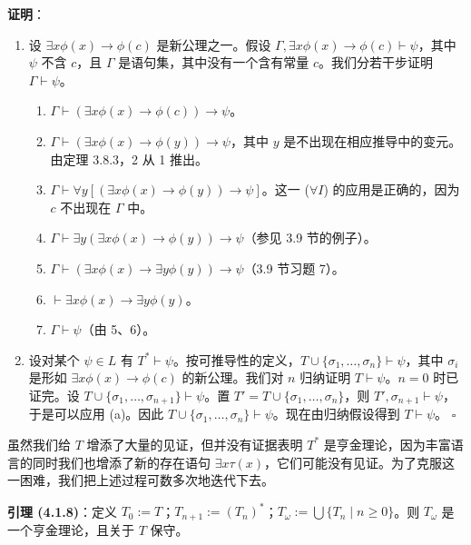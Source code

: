 \documentclass[12pt, a4paper]{article}
\begin{document}
\textbf{证明}：
\begin{enumerate}
    \item[(a)] 设 \(\exists x \phi(x) \to \phi(c)\) 是新公理之一。假设 \(\Gamma, \exists x \phi(x) \to \phi(c) \vdash \psi\)，其中 \(\psi\) 不含 \(c\)，且 \(\Gamma\) 是语句集，其中没有一个含有常量 \(c\)。我们分若干步证明 \(\Gamma \vdash \psi\)。
    \begin{enumerate}
        \item \(\Gamma \vdash (\exists x \phi(x) \to \phi(c)) \to \psi\)。
        \item \(\Gamma \vdash (\exists x \phi(x) \to \phi(y)) \to \psi\)，其中 \(y\) 是不出现在相应推导中的变元。由定理 3.8.3，2 从 1 推出。
        \item \(\Gamma \vdash \forall y[(\exists x \phi(x) \to \phi(y)) \to \psi]\)。这一 (\(\forall I\)) 的应用是正确的，因为 \(c\) 不出现在 \(\Gamma\) 中。
        \item \(\Gamma \vdash \exists y(\exists x \phi(x) \to \phi(y)) \to \psi\)（参见 3.9 节的例子）。
        \item \(\Gamma \vdash (\exists x \phi(x) \to \exists y \phi(y)) \to \psi\)（3.9 节习题 7）。
        \item \(\vdash \exists x \phi(x) \to \exists y \phi(y)\)。
        \item \(\Gamma \vdash \psi\)（由 5、6）。
    \end{enumerate}
    \item[(b)] 设对某个 \(\psi \in L\) 有 \(T^* \vdash \psi\)。按可推导性的定义，\(T \cup \{\sigma_1, \dots, \sigma_n\} \vdash \psi\)，其中 \(\sigma_i\) 是形如 \(\exists x \phi(x) \to \phi(c)\) 的新公理。我们对 \(n\) 归纳证明 \(T \vdash \psi\)。\(n=0\) 时已证完。设 \(T \cup \{\sigma_1, \dots, \sigma_{n+1}\} \vdash \psi\)。置 \(T' = T \cup \{\sigma_1, \dots, \sigma_n\}\)，则 \(T', \sigma_{n+1} \vdash \psi\)，于是可以应用 (a)。因此 \(T \cup \{\sigma_1, \dots, \sigma_n\} \vdash \psi\)。现在由归纳假设得到 \(T \vdash \psi\)。 \hfill \(\square\)
\end{enumerate}

虽然我们给 \(T\) 增添了大量的见证，但并没有证据表明 \(T^*\) 是亨金理论，因为丰富语言的同时我们也增添了新的存在语句 \(\exists x \tau(x)\)，它们可能没有见证。为了克服这一困难，我们把上述过程可数多次地迭代下去。

\begin{mdframed}
\textbf{引理 (4.1.8)}：定义 \(T_0 := T\)；\(T_{n+1} := (T_n)^*\)；\(T_\omega := \bigcup \{T_n \mid n \geq 0\}\)。则 \(T_\omega\) 是一个亨金理论，且关于 \(T\) 保守。
\end{mdframed}
\end{document}
